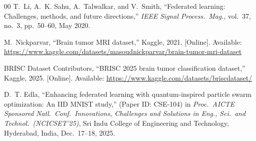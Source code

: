\documentclass[conference]{IEEEtran}
\begin{document}
\begin{thebibliography}{00}
T.~Li, A.~K. Sahu, A.~Talwalkar, and V.~Smith,
``Federated learning: Challenges, methods, and future directions,''
\textit{IEEE Signal Process.\ Mag.}, vol.~37, no.~3, pp.~50--60,
May 2020.

M.~Nickparvar,
``Brain tumor MRI dataset,''
Kaggle, 2021. [Online]. Available:
\url{https://www.kaggle.com/datasets/masoudnickparvar/brain-tumor-mri-dataset}

BRISC Dataset Contributors,
``BRISC 2025 brain tumor classification dataset,''
Kaggle, 2025. [Online]. Available:
\url{https://www.kaggle.com/datasets/briscdataset/}

D.~T. Edla,
``Enhancing federated learning with quantum-inspired particle swarm
optimization: An {IID} {MNIST} study,'' (Paper ID: CSE-104)
in \textit{Proc.\ AICTE Sponsored Natl.\ Conf.\ Innovations, Challenges
and Solutions in Eng., Sci.\ and Technol.\ (NCICSET'25)},
Sri Indu College of Engineering and Technology, Hyderabad, India,
Dec.\ 17--18, 2025.

\end{thebibliography}
\end{document}
